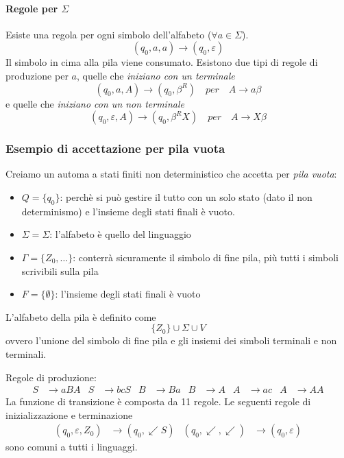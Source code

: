 \documentclass[11pt]{article}
\begin{document}
\paragraph*{Regole per $\Sigma$}
Esiste una regola per ogni simbolo dell'alfabeto ($\forall a\in \Sigma$).
\begin{equation*}
    (q_0,a,a)\rightarrow(q_0,\varepsilon)
\end{equation*}
Il simbolo in cima alla pila viene consumato.
Esistono due tipi di regole di produzione per $a$, quelle che \textit{iniziano con un terminale} 
\begin{equation*}
    (q_0,a,A)\rightarrow(q_0,\beta^R)\quad per \quad A\rightarrow a\beta
\end{equation*}
e quelle che \textit{iniziano con un non terminale}
\begin{equation*}
    (q_0,\varepsilon,A)\rightarrow(q_0,\beta^R X)\quad per \quad A\rightarrow X\beta
\end{equation*}
\subsubsection{Esempio di accettazione per pila vuota}
Creiamo un automa a stati finiti non deterministico che accetta per \textit{pila vuota}:
\begin{itemize}
    \item $Q=\{q_0\}$: perchè si può gestire il tutto con un solo stato (dato il non determinismo) e l'insieme degli stati finali è vuoto.
    \item $\Sigma=\Sigma$: l'alfabeto è quello del linguaggio
    \item $\Gamma=\{Z_0,\dots\}$: conterrà sicuramente il simbolo di fine pila, più tutti i simboli scrivibili sulla pila 
    \item $F=\{\emptyset\}$: l'insieme degli stati finali è vuoto
\end{itemize}

L'alfabeto della pila è definito come
\begin{equation*}
    \{Z_0\}\cup \Sigma \cup V
\end{equation*}
ovvero l'unione del simbolo di fine pila e gli insiemi dei simboli terminali e non terminali.

Regole di produzione:
\begin{align*}
    S&\rightarrow aBA & S&\rightarrow bcS & B&\rightarrow Ba & B&\rightarrow A & A&\rightarrow ac & A&\rightarrow AA
\end{align*}
La funzione di transizione è composta da 11 regole. Le seguenti regole di inizializzazione e terminazione
\begin{align*}
    (q_0,\varepsilon,Z_0)&\rightarrow(q_0,\swarrow S) & (q_0,\swarrow,\swarrow)&\rightarrow(q_0,\varepsilon)
\end{align*}
sono comuni a tutti i linguaggi.
\end{document}
